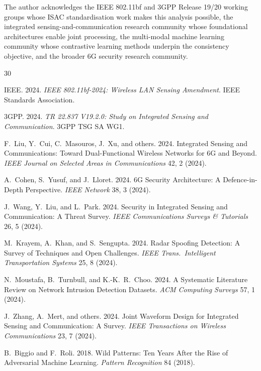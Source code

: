 \documentclass[sigconf,nonacm]{acmart}
\begin{document}
\begin{acks}
The author acknowledges the IEEE 802.11bf and 3GPP Release 19/20
working groups whose ISAC standardisation work makes this
analysis possible, the integrated sensing-and-communication
research community whose foundational architectures enable joint
processing, the multi-modal machine learning community whose
contrastive learning methods underpin the consistency objective,
and the broader 6G security research community.
\end{acks}

\sloppy

\begin{thebibliography}{30}

IEEE. 2024. \textit{IEEE 802.11bf-2024: Wireless LAN Sensing
Amendment}. IEEE Standards Association.

3GPP. 2024. \textit{TR 22.837 V19.2.0: Study on Integrated
Sensing and Communication}. 3GPP TSG SA WG1.

F.~Liu, Y.~Cui, C.~Masouros, J.~Xu, and others. 2024. Integrated
Sensing and Communications: Toward Dual-Functional Wireless
Networks for 6G and Beyond. \textit{IEEE Journal on Selected
Areas in Communications} 42, 2 (2024).

A.~Cohen, S.~Yusuf, and J.~Lloret. 2024. 6G Security Architecture:
A Defence-in-Depth Perspective. \textit{IEEE Network} 38, 3 (2024).

J.~Wang, Y.~Liu, and L.~Park. 2024. Security in Integrated
Sensing and Communication: A Threat Survey.
\textit{IEEE Communications Surveys \& Tutorials} 26, 5 (2024).

M.~Krayem, A.~Khan, and S.~Sengupta. 2024. Radar Spoofing
Detection: A Survey of Techniques and Open Challenges.
\textit{IEEE Trans.\ Intelligent Transportation Systems}
25, 8 (2024).

N.~Moustafa, B.~Turnbull, and K.-K.~R.~Choo. 2024. A Systematic
Literature Review on Network Intrusion Detection Datasets.
\textit{ACM Computing Surveys} 57, 1 (2024).

J.~Zhang, A.~Mert, and others. 2024. Joint Waveform Design for
Integrated Sensing and Communication: A Survey.
\textit{IEEE Transactions on Wireless Communications}
23, 7 (2024).

B.~Biggio and F.~Roli. 2018. Wild Patterns: Ten Years After the
Rise of Adversarial Machine Learning. \textit{Pattern Recognition}
84 (2018).


\end{thebibliography}
\end{document}
